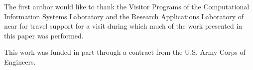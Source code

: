 \begin{acks}
  The first author would like to thank the Visitor Programs of the Computational Information Systems Laboratory
  and the Research Applications Laboratory of \gls{ncar} for travel support for a visit during which much of
  the work presented in this paper was performed.

  This work was funded in part through a contract from the U.S. Army Corps of Engineers.

\end{acks}
